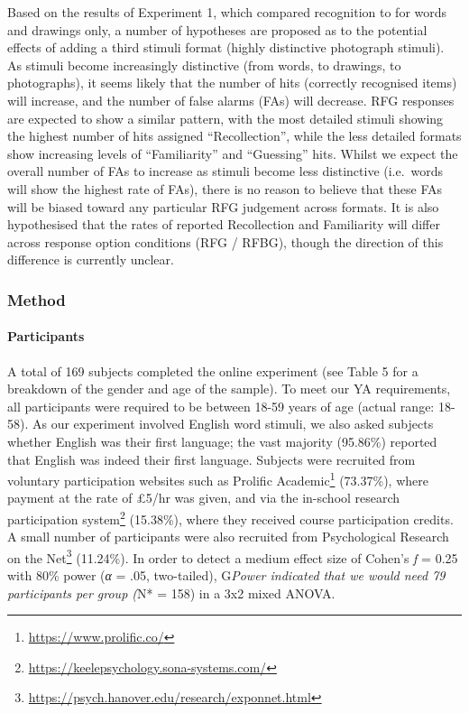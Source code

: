 \documentclass[
  11pt,
]{article}
\begin{document}
Based on the results of Experiment 1, which compared recognition to for
words and drawings only, a number of hypotheses are proposed as to the
potential effects of adding a third stimuli format (highly distinctive
photograph stimuli). As stimuli become increasingly distinctive (from
words, to drawings, to photographs), it seems likely that the number of
hits (correctly recognised items) will increase, and the number of false
alarms (FAs) will decrease. RFG responses are expected to show a similar
pattern, with the most detailed stimuli showing the highest number of
hits assigned ``Recollection'', while the less detailed formats show
increasing levels of ``Familiarity'' and ``Guessing'' hits. Whilst we
expect the overall number of FAs to increase as stimuli become less
distinctive (i.e.~words will show the highest rate of FAs), there is no
reason to believe that these FAs will be biased toward any particular
RFG judgement across formats. It is also hypothesised that the rates of
reported Recollection and Familiarity will differ across response option
conditions (RFG / RFBG), though the direction of this difference is
currently unclear.

\hypertarget{method-2}{%
\subsubsection{Method}\label{method-2}}

\hypertarget{participants-2}{%
\paragraph{Participants}\label{participants-2}}

A total of 169 subjects completed the online experiment (see Table 5 for
a breakdown of the gender and age of the sample). To meet our YA
requirements, all participants were required to be between 18-59 years
of age (actual range: 18-58). As our experiment involved English word
stimuli, we also asked subjects whether English was their first
language; the vast majority (95.86\%) reported that English was indeed
their first language. Subjects were recruited from voluntary
participation websites such as
Prolific Academic\footnote{\url{https://www.prolific.co/}} (73.37\%),
where payment at the rate of £5/hr was given, and via the in-school
research participation system\footnote{\url{https://keelepsychology.sona-systems.com/}}
(15.38\%), where they received course participation credits. A small
number of participants were also recruited from
Psychological Research on the Net\footnote{\url{https://psych.hanover.edu/research/exponnet.html}}
(11.24\%). In order to detect a medium effect size of Cohen's \emph{f} =
0.25 with 80\% power (\emph{α} = .05, two-tailed), G\emph{Power
indicated that we would need 79 participants per group (}N* = 158) in a
3x2 mixed ANOVA.
\end{document}
